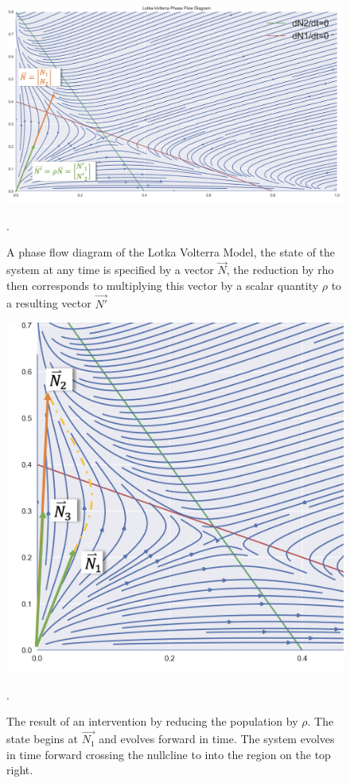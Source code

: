 \begin{figure}[h]
  \centering
  \includegraphics[width = \textwidth]{fig/graph_004.png}
  \caption {A phase flow diagram of the Lotka Volterra Model, the state of the system at any time is specified by a vector $\vec{N}$, the reduction by rho then corresponds to multiplying this vector by a scalar quantity $\rho$ to a resulting vector $\vec{N'}$}. 
  \label{fig:phase_flow}
\end{figure}


\begin{figure}[h]
  \centering
  \includegraphics[width = \textwidth]{fig/graph_005.png}
  \caption {The result of an intervention by reducing the population by $\rho$. The state begins at $\vec{N_1}$ and evolves forward in time. The system evolves in time forward crossing the nullcline to into the region on the top right.}. 
  \label{fig:phase_flow_intervention}
\end{figure}

